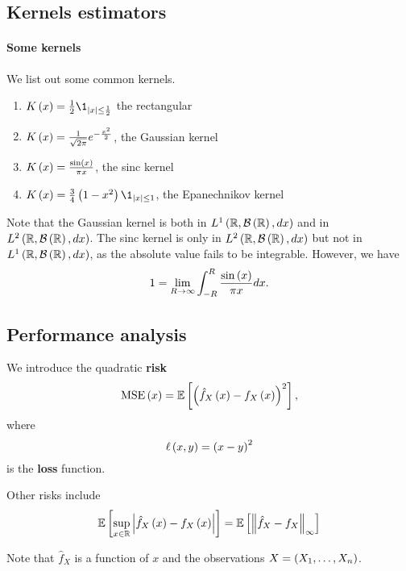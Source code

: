 
\subsection{Kernels estimators}
\paragraph{Some kernels} We list out some common kernels.
\begin{enumerate}
  \item \label{ker:rect} $K\pa{x}=\frac{1}{2}\1_{\abs{x}\le \frac{1}{2}}$ the rectangular
  \item\label{ker:gauss} $K\left(x\right) = \frac{1}{\sqrt{2\pi}} e^{-\frac{x^2}{2}}$, the Gaussian kernel
  \item\label{ker:sinc} $K\left(x\right) = \frac{\sin\left(x\right)}{\pi x}$, the sinc kernel
  \item \label{ker:epan} $K\pa{x} = \frac{3}{4}\pa{1-x^2}\1_{\abs{x}\le 1}$, the Epanechnikov kernel
\end{enumerate}
\begin{remark}
  Note that the Gaussian kernel is both in $L^1\left(\mathbb{R},\mathcal{B}\left(\mathbb{R}\right),dx\right)$ and in $L^2\left(\mathbb{R},\mathcal{B}\left(\mathbb{R}\right),dx\right)$. The sinc kernel is only in $L^2\left(\mathbb{R},\mathcal{B}\left(\mathbb{R}\right),dx\right)$ but not in $L^1\left(\mathbb{R},\mathcal{B}\left(\mathbb{R}\right),dx\right)$, as the absolute value fails to be integrable. However, we have
  \begin{equation*}
    1 = \lim_{R\rightarrow \infty}\int_{-R}^R \frac{\sin\left(x\right)}{\pi x} dx.
  \end{equation*}
\end{remark}

\subsection{Performance analysis}
\begin{definition}
  We introduce the quadratic \textbf{risk}
  \begin{equation*}
    \mathrm{MSE}\left(x\right) = \mathbb{E}\left[\left(\hat{f}_X\left(x\right) - f_X\left(x\right)\right)^2\right],
  \end{equation*}
  where
  \begin{equation*}
    \ell\left(x,y\right) = \left(x-y\right)^2
  \end{equation*}
  is the \textbf{loss} function.

  Other risks include
  \begin{equation*}
    \mathbb{E}\left[\sup_{x\in \mathbb{R}} \left| \hat{f}_X\left(x\right)-f_X\left(x\right)\right|\right] = \mathbb{E}\left[\left\| \hat{f}_X-f_X  \right\|_\infty\right]
  \end{equation*}
\end{definition}
Note that $\hat{f}_X$ is a function of $x$ and the observations $X= \left(X_1,\ldots, X_n\right)$.

